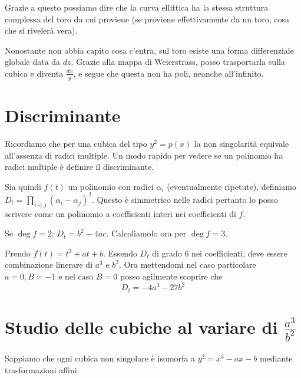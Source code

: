 	Grazie a questo possiamo dire che la curva ellittica ha la stessa struttura complessa del toro da cui proviene (se proviene effettivamente da un toro, cosa che si rivelerà vera).
	
	\begin{osservazione}
		Nonostante non abbia capito cosa c'entra, sul toro esiste una forma differenziale globale data da $dz$. Grazie alla mappa di Weierstrass, posso trasportarla sulla cubica e diventa $\frac{dx}y$, e segue che questa non ha poli, neanche all'infinito.
	
	\end{osservazione}

        
	\section{Discriminante}
	
	Ricordiamo che per una cubica del tipo $y^2=p(x)$ la non singolarità equivale all'assenza di radici multiple. Un modo rapido per vedere se un polinomio ha radici multiple è definire il discriminante.
	
	Sia quindi $f(t)$ un polinomio con radici $\alpha_i$ (eventualmente ripetute), definiamo $D_t=\prod_{i<j} (\alpha_i - \alpha_j)^2$. Questo è simmetrico nelle radici pertanto lo posso scrivere come un polinomio a coefficienti interi nei coefficienti di $f$.
	
	Se $\deg f=2$: $D_t= b^2-4ac$. Calcoliamolo ora per $\deg f=3$.

	Prendo $f(t) = t^3 + a t + b$. Essendo $D_t$ di grado 6 nei coefficienti, deve essere combinazione linerare di $a^3$ e $b^2$. Ora mettendomi nel caso particolare $a = 0, B = -1$ e nel caso $B = 0$ posso agilmente scoprire che 
	\[
		D_t = -4a^3 - 27b^2
	\]
	
	\section{Studio delle cubiche al variare di $\frac{a^3}{b^2}$}
	
	Sappiamo che ogni cubica non singolare è isomorfa a $y^2=x^3-ax-b$ mediante trasformazioni affini.
	
